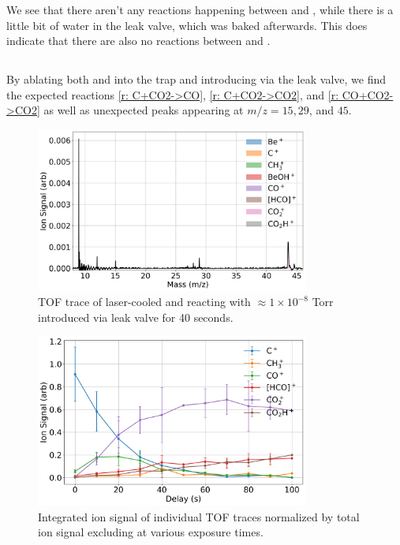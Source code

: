 We see that there aren't any reactions happening between  and , while there is a little bit of water in the leak valve, which was baked afterwards. This does indicate that there are also no reactions between  and .

\subsection{}
By ablating both  and  into the trap and introducing  via the leak valve, we find the expected reactions \ref{r: C+CO2->CO}, \ref{r: C+CO2->CO2}, and \ref{r: CO+CO2->CO2} as well as unexpected peaks appearing at $m/z=15, 29$, and $45$.

\begin{figure}
	\label{fig: C+CO2 TOF}
	\centering
	\includegraphics[width=0.8\textwidth]{images/C_CO2_TOF.png}
	\caption{TOF trace of laser-cooled  and  reacting with $\approx 1 \times 10^{-8}$ Torr  introduced via leak valve for 40 seconds.}
\end{figure}

\begin{figure}
	\label{fig: C+CO2 traces}
	\centering
	\includegraphics[width=0.8\textwidth]{images/C_CO2_traces.png}
	\caption{Integrated ion signal of individual TOF traces normalized by total ion signal excluding  at various  exposure times.}
\end{figure}

